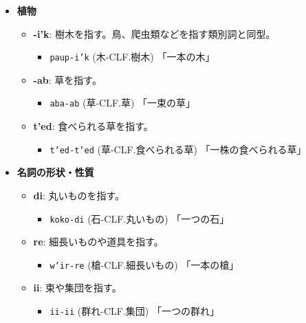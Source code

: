 \begin{itemize}
    \item \textbf{植物} %
        \begin{itemize}
            \item \textbf{-i'k}: 樹木を指す。鳥、爬虫類などを指す類別詞と同型。
                \begin{itemize}
                    \item \texttt{paup-i'k} (木-CLF.樹木) %
                    \quad 「一本の木」
                \end{itemize}
            \item \textbf{-ab}: 草を指す。
                \begin{itemize}
                    \item \texttt{aba-ab} (草-CLF.草) %
                    \quad 「一束の草」
                \end{itemize}
            \item \textbf{t'ed}: 食べられる草を指す。%
                \begin{itemize}
                    \item \texttt{t'ed-t'ed} (草-CLF.食べられる草) %
                    \quad 「一株の食べられる草」
                \end{itemize}
        \end{itemize}
    \item \textbf{名詞の形状・性質}
        \begin{itemize}
            \item \textbf{di}: 丸いものを指す。
                \begin{itemize}
                    \item \texttt{koko-di} (石-CLF.丸いもの) %
                    \quad 「一つの石」
                \end{itemize}
            \item \textbf{re}: 細長いものや道具を指す。
                \begin{itemize}
                    \item \texttt{w'ir-re} (槍-CLF.細長いもの) %
                    \quad 「一本の槍」
                \end{itemize}
            \item \textbf{ii}: 束や集団を指す。
                \begin{itemize}
                    \item \texttt{ii-ii} (群れ-CLF.集団) %
                    \quad 「一つの群れ」

\end{itemize}
\end{itemize}
\end{itemize}
